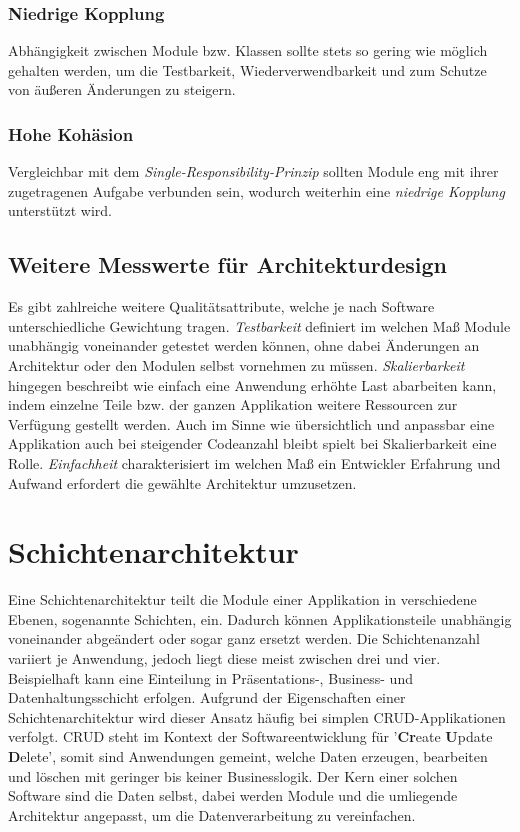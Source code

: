 \documentclass[conference]{IEEEtran}
\begin{document}
\subsubsection{Niedrige Kopplung} Abhängigkeit zwischen Module bzw. Klassen sollte stets so gering wie möglich gehalten werden, um die Testbarkeit, Wiederverwendbarkeit und zum Schutze von äußeren Änderungen zu steigern.

\subsubsection{Hohe Kohäsion} Vergleichbar mit dem \emph{Single-Responsibility-Prinzip} sollten Module eng mit ihrer zugetragenen Aufgabe verbunden sein, wodurch weiterhin eine \emph{niedrige Kopplung} unterstützt wird.



\subsection{Weitere Messwerte für Architekturdesign} Es gibt zahlreiche weitere Qualitätsattribute, welche je nach Software unterschiedliche Gewichtung tragen. \emph{Testbarkeit} definiert im welchen Maß Module unabhängig voneinander getestet werden können, ohne dabei Änderungen an Architektur oder den Modulen selbst vornehmen zu müssen. \emph{Skalierbarkeit} hingegen beschreibt wie einfach eine Anwendung erhöhte Last abarbeiten kann, indem einzelne Teile bzw. der ganzen Applikation weitere Ressourcen zur Verfügung gestellt werden. Auch im Sinne wie übersichtlich und anpassbar eine Applikation auch bei steigender Codeanzahl bleibt spielt bei Skalierbarkeit eine Rolle. \emph{Einfachheit} charakterisiert im welchen Maß ein Entwickler Erfahrung und Aufwand erfordert die gewählte Architektur umzusetzen.


\section{Schichtenarchitektur}

Eine Schichtenarchitektur teilt die Module einer Applikation in verschiedene Ebenen, sogenannte Schichten, ein. Dadurch können Applikationsteile unabhängig voneinander abgeändert oder sogar ganz ersetzt werden. Die Schichtenanzahl variiert je Anwendung, jedoch liegt diese meist zwischen drei und vier. Beispielhaft kann eine Einteilung in Präsentations-, Business- und Datenhaltungsschicht erfolgen. Aufgrund der Eigenschaften einer Schichtenarchitektur wird dieser Ansatz häufig bei simplen CRUD-Applikationen verfolgt. CRUD steht im Kontext der Softwareentwicklung für '\textbf{Cr}eate \textbf{U}pdate \textbf{D}elete', somit sind Anwendungen gemeint, welche Daten erzeugen, bearbeiten und löschen mit geringer bis keiner Businesslogik. Der Kern einer solchen Software sind die Daten selbst, dabei werden Module und die umliegende Architektur angepasst, um die Datenverarbeitung zu vereinfachen. %
\end{document}
